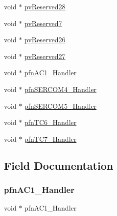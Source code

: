 \begin{DoxyCompactItemize}
void $\ast$ \mbox{\hyperlink{struct___device_vectors_a8f55585b807e39e0640785277f0d4536}{pv\+Reserved28}}
\item 
void $\ast$ \mbox{\hyperlink{struct___device_vectors_ab54f368a5f3bc924823ab649e6fd9474}{pv\+Reserved7}}
\item 
void $\ast$ \mbox{\hyperlink{struct___device_vectors_a19ae7509ebce30b4d1f88c3c443e4a37}{pv\+Reserved26}}
\item 
void $\ast$ \mbox{\hyperlink{struct___device_vectors_a69338a59c843eff9ca99a3b116a909a3}{pv\+Reserved27}}
\item 
void $\ast$ \mbox{\hyperlink{struct___device_vectors_abbf46e8ac6915c62e67c6749d70c8451}{pfn\+A\+C1\+\_\+\+Handler}}
\item 
void $\ast$ \mbox{\hyperlink{struct___device_vectors_ab4b56b939fe994368d17945ad2d6779c}{pfn\+S\+E\+R\+C\+O\+M4\+\_\+\+Handler}}
\item 
void $\ast$ \mbox{\hyperlink{struct___device_vectors_a2d33ae58069d9b7bd812d63babe5d09b}{pfn\+S\+E\+R\+C\+O\+M5\+\_\+\+Handler}}
\item 
void $\ast$ \mbox{\hyperlink{struct___device_vectors_afe0d7cd350fa355d6c926f2852aef32b}{pfn\+T\+C6\+\_\+\+Handler}}
\item 
void $\ast$ \mbox{\hyperlink{struct___device_vectors_ada8d3f394384d5263803870b29378a31}{pfn\+T\+C7\+\_\+\+Handler}}
\end{DoxyCompactItemize}


\subsection{Field Documentation}
\mbox{\label{struct___device_vectors_abbf46e8ac6915c62e67c6749d70c8451}} 
\subsubsection{\texorpdfstring{pfnAC1\_Handler}{pfnAC1\_Handler}}
{\footnotesize\ttfamily void $\ast$ pfn\+A\+C1\+\_\+\+Handler}

\mbox{\label{struct___device_vectors_a4638ac0dc2efd342a1afd452139fbbf1}} 
